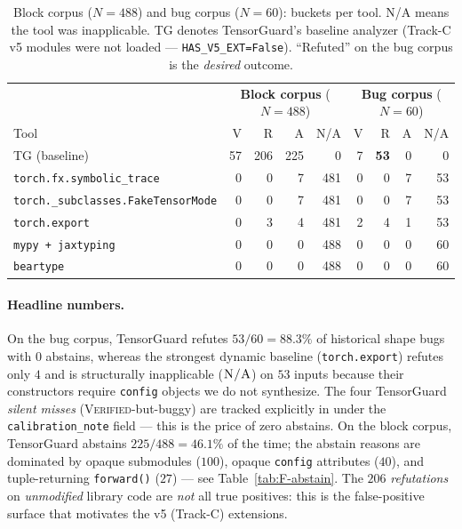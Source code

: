 \begin{table}[t]
\centering
\caption{Block corpus ($N=488$) and bug corpus ($N=60$):
buckets per tool. N/A means the tool was inapplicable.
\textsc{TG} denotes TensorGuard's baseline analyzer (Track-C v5
modules were not loaded — \texttt{HAS\_V5\_EXT=False}).
``Refuted'' on the bug corpus is the \emph{desired} outcome.}
\label{tab:F-headline}
\small
\begin{tabular}{l rrrr | rrrr}
\toprule
& \multicolumn{4}{c|}{\textbf{Block corpus} ($N{=}488$)}
& \multicolumn{4}{c}{\textbf{Bug corpus} ($N{=}60$)} \\
Tool & V & R & A & N/A & V & R & A & N/A \\
\midrule
\textsc{TG} (baseline) & 57 & 206 & 225 & 0 & 7 & \textbf{53} & 0 & 0 \\
\texttt{torch.fx.symbolic\_trace} & 0 & 0 & 7 & 481 & 0 & 0 & 7 & 53 \\
\texttt{torch.\_subclasses.FakeTensorMode} & 0 & 0 & 7 & 481 & 0 & 0 & 7 & 53 \\
\texttt{torch.export} & 0 & 3 & 4 & 481 & 2 & 4 & 1 & 53 \\
\texttt{mypy + jaxtyping} & 0 & 0 & 0 & 488 & 0 & 0 & 0 & 60 \\
\texttt{beartype} & 0 & 0 & 0 & 488 & 0 & 0 & 0 & 60 \\
\bottomrule
\end{tabular}
\end{table}

\paragraph{Headline numbers.}
On the bug corpus, TensorGuard refutes $53/60 = 88.3\%$ of historical
shape bugs with $0$ abstains, whereas the strongest dynamic baseline
(\texttt{torch.export}) refutes only $4$ and is structurally inapplicable
($\textsc{N/A}$) on $53$ inputs because their constructors require
\texttt{config} objects we do not synthesize. The four TensorGuard
\emph{silent misses} (\textsc{Verified}-but-buggy) are tracked
explicitly in 
under the \texttt{calibration\_note} field — this is the price of zero
abstains. On the block corpus, TensorGuard abstains $225/488 = 46.1\%$
of the time; the abstain reasons are dominated by opaque submodules
($100$), opaque \texttt{config} attributes ($40$), and tuple-returning
\texttt{forward()} ($27$) — see Table~\ref{tab:F-abstain}. The
$206$ \emph{refutations} on \emph{unmodified} library code are
\emph{not} all true positives: this is the false-positive surface that
motivates the v5 (Track-C) extensions.

